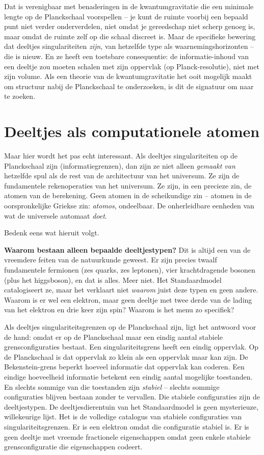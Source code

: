 \documentclass[11pt, twoside, openright]{book}
\begin{document}
Dat is verenigbaar met benaderingen in de kwantumgravitatie die een minimale lengte op de Planckschaal voorspellen -- je kunt de ruimte voorbij een bepaald punt niet verder onderverdelen, niet omdat je gereedschap niet scherp genoeg is, maar omdat de ruimte zelf op die schaal discreet is. Maar de specifieke bewering dat deeltjes singulariteiten \textit{zijn}, van hetzelfde type als waarnemingshorizonten -- die is nieuw. En ze heeft een toetsbare consequentie: de informatie-inhoud van een deeltje zou moeten schalen met zijn oppervlak (op Planck-resolutie), niet met zijn volume. Als een theorie van de kwantumgravitatie het ooit mogelijk maakt om structuur nabij de Planckschaal te onderzoeken, is dit de signatuur om naar te zoeken.

\section*{Deeltjes als computationele atomen}

Maar hier wordt het pas echt interessant. Als deeltjes singulariteiten op de Planckschaal zijn (informatiegrenzen), dan zijn ze niet alleen \textit{gemaakt van} hetzelfde spul als de rest van de architectuur van het universum. Ze zijn de fundamentele rekenoperaties van het universum. Ze zijn, in een precieze zin, de atomen van de berekening. Geen atomen in de scheikundige zin -- atomen in de oorspronkelijke Griekse zin: \textit{atomos}, ondeelbaar. De onherleidbare eenheden van wat de universele automaat \textit{doet}.

Bedenk eens wat hieruit volgt.

\textbf{Waarom bestaan alleen bepaalde deeltjestypen?} Dit is altijd een van de vreemdere feiten van de natuurkunde geweest. Er zijn precies twaalf fundamentele fermionen (zes quarks, zes leptonen), vier krachtdragende bosonen (plus het higgsboson), en dat is alles. Meer niet. Het Standaardmodel catalogiseert ze, maar het verklaart niet \textit{waarom} juist deze typen en geen andere. Waarom is er wel een elektron, maar geen deeltje met twee derde van de lading van het elektron en drie keer zijn spin? Waarom is het menu zo specifiek?

Als deeltjes singulariteitsgrenzen op de Planckschaal zijn, ligt het antwoord voor de hand: omdat er op de Planckschaal maar een eindig aantal stabiele grensconfiguraties bestaat. Een singulariteitsgrens heeft een eindig oppervlak. Op de Planckschaal is dat oppervlak zo klein als een oppervlak maar kan zijn. De Bekenstein-grens beperkt hoeveel informatie dat oppervlak kan coderen. Een eindige hoeveelheid informatie betekent een eindig aantal mogelijke toestanden. En slechts sommige van die toestanden zijn \textit{stabiel} -- slechts sommige configuraties blijven bestaan zonder te vervallen. Die stabiele configuraties zijn de deeltjestypen. De deeltjesdierentuin van het Standaardmodel is geen mysterieuze, willekeurige lijst. Het is de volledige catalogus van stabiele configuraties van singulariteitsgrenzen. Er is een elektron omdat die configuratie stabiel is. Er is geen deeltje met vreemde fractionele eigenschappen omdat geen enkele stabiele grensconfiguratie die eigenschappen codeert.
\end{document}

